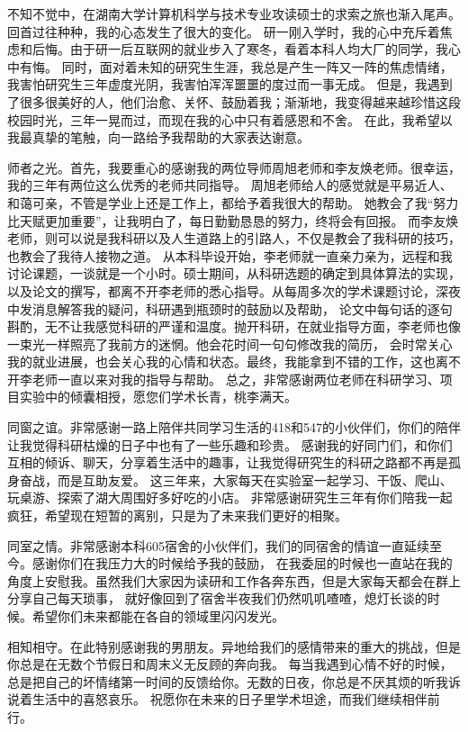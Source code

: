 \begin{acknowledgements}
	不知不觉中，在湖南大学计算机科学与技术专业攻读硕士的求索之旅也渐入尾声。回首过往种种，我的心态发生了很大的变化。
	研一刚入学时，我的心中充斥着焦虑和后悔。由于研一后互联网的就业步入了寒冬，看着本科人均大厂的同学，我心中有悔。
	同时，面对着未知的研究生生涯，我总是产生一阵又一阵的焦虑情绪，我害怕研究生三年虚度光阴，我害怕浑浑噩噩的度过而一事无成。
	但是，我遇到了很多很美好的人，他们治愈、关怀、鼓励着我；渐渐地，我变得越来越珍惜这段校园时光，三年一晃而过，而现在我的心中只有着感恩和不舍。
	在此，我希望以我最真挚的笔触，向一路给予我帮助的大家表达谢意。

	师者之光。首先，我要重心的感谢我的两位导师周旭老师和李友焕老师。很幸运，我的三年有两位这么优秀的老师共同指导。
	周旭老师给人的感觉就是平易近人、和蔼可亲，不管是学业上还是工作上，都给予着我很大的帮助。
	她教会了我“努力比天赋更加重要”，让我明白了，每日勤勤恳恳的努力，终将会有回报。
	而李友焕老师，则可以说是我科研以及人生道路上的引路人，不仅是教会了我科研的技巧，也教会了我待人接物之道。
	从本科毕设开始，李老师就一直亲力亲为，远程和我讨论课题，一谈就是一个小时。硕士期间，从科研选题的确定到具体算法的实现，
	以及论文的撰写，都离不开李老师的悉心指导。从每周多次的学术课题讨论，深夜中发消息解答我的疑问，科研遇到瓶颈时的鼓励以及帮助，
	论文中每句话的逐句斟酌，无不让我感觉科研的严谨和温度。抛开科研，在就业指导方面，李老师也像一束光一样照亮了我前方的迷惘。他会花时间一句句修改我的简历，
	会时常关心我的就业进展，也会关心我的心情和状态。最终，我能拿到不错的工作，这也离不开李老师一直以来对我的指导与帮助。
	总之，非常感谢两位老师在科研学习、项目实验中的倾囊相授，愿您们学术长青，桃李满天。
	
	同窗之谊。非常感谢一路上陪伴共同学习生活的418和547的小伙伴们，你们的陪伴让我觉得科研枯燥的日子中也有了一些乐趣和珍贵。
	感谢我的好同门们，和你们互相的倾诉、聊天，分享着生活中的趣事，让我觉得研究生的科研之路都不再是孤身奋战，而是互助友爱。
	这三年来，大家每天在实验室一起学习、干饭、爬山、玩桌游、探索了湖大周围好多好吃的小店。
	非常感谢研究生三年有你们陪我一起疯狂，希望现在短暂的离别，只是为了未来我们更好的相聚。
	
	同室之情。非常感谢本科605宿舍的小伙伴们，我们的同宿舍的情谊一直延续至今。感谢你们在我压力大的时候给予我的鼓励，
	在我委屈的时候也一直站在我的角度上安慰我。虽然我们大家因为读研和工作各奔东西，但是大家每天都会在群上分享自己每天琐事，
	就好像回到了宿舍半夜我们仍然叽叽喳喳，熄灯长谈的时候。希望你们未来都能在各自的领域里闪闪发光。
	
	相知相守。在此特别感谢我的男朋友。异地给我们的感情带来的重大的挑战，但是你总是在无数个节假日和周末义无反顾的奔向我。
	每当我遇到心情不好的时候，总是把自己的坏情绪第一时间的反馈给你。无数的日夜，你总是不厌其烦的听我诉说着生活中的喜怒哀乐。
	祝愿你在未来的日子里学术坦途，而我们继续相伴前行。


\end{acknowledgements}

